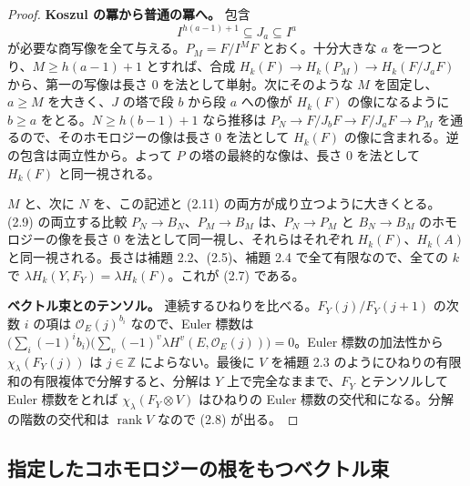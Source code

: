 \documentclass[11pt,a4paper]{ltjsarticle}
\theoremstyle{plain}
\theoremstyle{definition}
\newcommand{\rank}{\operatorname{rank}}
\newcommand{\Z}{\mathbb{Z}}
\newcommand{\cO}{\mathcal{O}}
\begin{document}
\begin{proof}
\textbf{Koszul の冪から普通の冪へ。} 包含
\begin{equation}\tag{2.12}
  I^{h(a-1)+1}\subseteq J_a\subseteq I^a
\end{equation}
が必要な商写像を全て与える。$P_M = F/I^MF$ とおく。十分大きな $a$ を一つとり、$M\ge h(a-1)+1$ とすれば、合成 $H_k(F)\to H_k(P_M)\to H_k(F/J_aF)$ から、第一の写像は長さ $0$ を法として単射。次にそのような $M$ を固定し、$a\ge M$ を大きく、$J$ の塔で段 $b$ から段 $a$ への像が $H_k(F)$ の像になるように $b\ge a$ をとる。$N\ge h(b-1)+1$ なら推移は $P_N\to F/J_bF\to F/J_aF\to P_M$ を通るので、そのホモロジーの像は長さ $0$ を法として $H_k(F)$ の像に含まれる。逆の包含は両立性から。よって $P$ の塔の最終的な像は、長さ $0$ を法として $H_k(F)$ と同一視される。

$M$ と、次に $N$ を、この記述と (2.11) の両方が成り立つように大きくとる。(2.9) の両立する比較 $P_N\to B_N$、$P_M\to B_M$ は、$P_N\to P_M$ と $B_N\to B_M$ のホモロジーの像を長さ $0$ を法として同一視し、それらはそれぞれ $H_k(F)$、$H_k(A)$ と同一視される。長さは補題 2.2、(2.5)、補題 2.4 で全て有限なので、全ての $k$ で $\lambda H_k(Y,F_Y) = \lambda H_k(F)$。これが (2.7) である。

\textbf{ベクトル束とのテンソル。} 連続するひねりを比べる。$F_Y(j)/F_Y(j+1)$ の次数 $i$ の項は $\cO_E(j)^{b_i}$ なので、Euler 標数は $\bigl(\sum_i(-1)^ib_i\bigr)\bigl(\sum_v(-1)^v\lambda H^v(E,\cO_E(j))\bigr) = 0$。Euler 標数の加法性から $\chi_\lambda(F_Y(j))$ は $j\in\Z$ によらない。最後に $V$ を補題 2.3 のようにひねりの有限和の有限複体で分解すると、分解は $Y$ 上で完全なままで、$F_Y$ とテンソルして Euler 標数をとれば $\chi_\lambda(F_Y\otimes V)$ はひねりの Euler 標数の交代和になる。分解の階数の交代和は $\rank V$ なので (2.8) が出る。
\end{proof}

\subsection{指定したコホモロジーの根をもつベクトル束}
\end{document}
